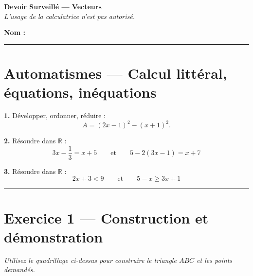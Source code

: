 \documentclass[12pt]{article}
\begin{document}
\begin{center}
\Large\textbf{Devoir Surveillé — Vecteurs}\\[0.3cm]
\textit{L’usage de la calculatrice n’est pas autorisé.}
\end{center}

\vspace{0.5cm}
\textbf{Nom :} \dotfill

\vspace{0.5cm}
\hrule
\vspace{0.4cm}

\section*{Automatismes — Calcul littéral, équations, inéquations}

\textbf{1.} Développer, ordonner, réduire :
\[
A = (2x - 1)^2 - (x + 1)^2.
\]
\begin{tcolorbox}[case]\end{tcolorbox}

\textbf{2.} Résoudre dans $\mathbb{R}$ :
\[
3x - \dfrac{1}{3} = x + 5 \qquad \text{et} \qquad 5 - 2(3x - 1) = x + 7
\]
\begin{tcolorbox}[case]\end{tcolorbox}

\textbf{3.} Résoudre dans $\mathbb{R}$ :
\[
2x + 3 < 9 \qquad \text{et} \qquad 5 - x \ge 3x + 1
\]
\begin{tcolorbox}[case]\end{tcolorbox}

\vspace{0.4cm}
\hrule
\vspace{0.4cm}

\section*{Exercice 1 — Construction et démonstration}

\begin{center}

\vspace{0.2cm}
\textit{Utilisez le quadrillage ci-dessus pour construire le triangle $ABC$ et les points demandés.}
\end{center}
\end{document}
